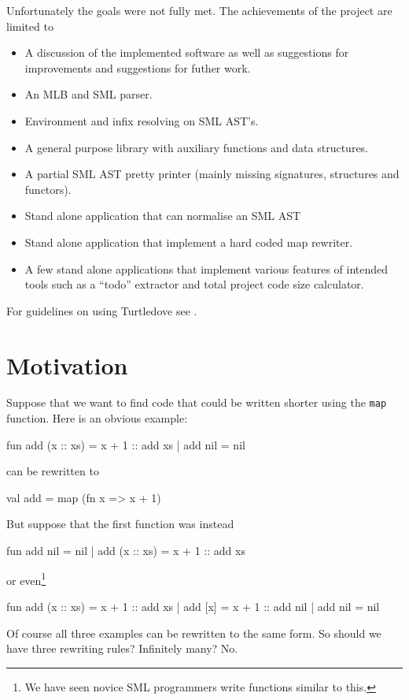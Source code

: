 Unfortunately the goals were not fully met. The achievements of the project
are limited to

\begin{itemize}

\item A discussion of the implemented software as well as suggestions for
improvements and suggestions for futher work.
\item An MLB and SML parser.
\item Environment and infix resolving on SML AST's.
\item A general purpose library with auxiliary functions and data structures.
\item A partial SML AST pretty printer (mainly missing signatures, structures
  and functors).
\item Stand alone application that can normalise an SML AST
\item Stand alone application that implement a hard coded \textsf{map} rewriter.
\item A few stand alone applications that implement various features of intended
  tools such as a ``todo'' extractor and total project code size calculator.
\end{itemize}

For guidelines on using Turtledove see .

\section{Motivation}
\label{sec:motivation}
Suppose that we want to find code that could be written shorter using the
\texttt{map} function.
Here is an obvious example:
\begin{sml}
fun add (x :: xs) = x + 1 :: add xs
  | add nil       = nil
\end{sml}
can be rewritten to
\begin{sml}
val add = map (fn x => x + 1)
\end{sml}
But suppose that the first function was instead
\begin{sml}
fun add nil       = nil
  | add (x :: xs) = x + 1 :: add xs
\end{sml}
or even\footnote{We have seen novice SML programmers write functions similar to
  this.}
\begin{sml}
fun add (x :: xs) = x + 1 :: add xs
  | add [x]       = x + 1 :: add nil
  | add nil       = nil
\end{sml}
Of course all three examples can be rewritten to the same form. So should we
have three rewriting rules? Infinitely many? No.

